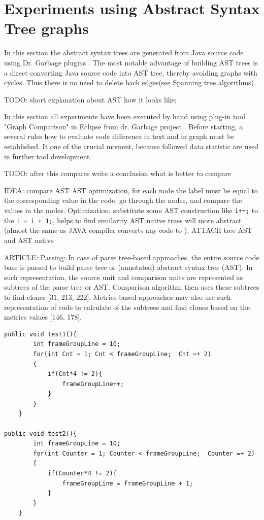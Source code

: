 \documentclass{report}
\begin{document}
\section{Experiments using Abstract Syntax Tree graphs}

In this section the abstract syntax trees are generated from Java source code using Dr. Garbage plugins \cite{drgarbage}.
The most notable advantage of building AST trees is a direct converting Java source code into AST tree, thereby avoiding graphs with cycles. Thus there is no need to delete back edges(see Spanning tree algorithms).

TODO: short explanation about AST how it looks like;

In this section all experiments have been executed by hand using plug-in tool "Graph Comparison" in Eclipse from dr. Garbage project \cite{drgarbage}.  Before starting, a several rules how to evaluate code difference in text and in graph must be established. It one of the crucial moment, because followed data statistic are used in further tool development.


TODO: after this compares write a conclusion what is better to compare

IDEA: compare AST
AST optimization, for each node the label must be equal to the corresponding value in the code.
go through the nodes, and compare the values in the nodes.
Optimization: substitute some AST construction like \texttt{i++;} to the \texttt{i = i + 1;}, helps to find similarity
AST native trees will more abstract (almost the same as JAVA compiler converts any code to ).
ATTACH tree AST and AST native

ARTICLE:
Parsing: In case of parse tree-based approaches, the entire source code base is parsed to build parse tree or (annotated) abstract syntax tree (AST). In such representation, the source unit and comparison units are represented as subtrees of the parse tree or AST. Comparison algorithm then uses these subtrees to find clones [31, 213, 222]. Metrics-based approaches may also use such representation of code to calculate of the subtrees and find clones based on the metrics values [146, 178].

\begin{lstlisting}
public void test1(){
		int frameGroupLine = 10;
		for(int Cnt = 1; Cnt < frameGroupLine;  Cnt =+ 2)
		{
			if(Cnt*4 != 2){
				frameGroupLine++;
			}
		}
	}
	
public void test2(){
		int frameGroupLine = 10;
		for(int Counter = 1; Counter < frameGroupLine;  Counter =+ 2)
		{
			if(Counter*4 != 2){ 
				frameGroupLine = frameGroupLine + 1;
			}
		}
	}	
\end{lstlisting}
\end{document}
